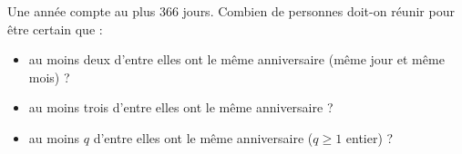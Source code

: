 Une année compte au plus $366$ jours. Combien de personnes doit-on réunir pour être certain que :
\begin{itemize}
  \item au moins deux d'entre elles ont le même anniversaire (même jour et même mois) ?
  \item au moins trois d'entre elles ont le même anniversaire ?
  \item au moins $q$ d'entre elles ont le même anniversaire ($q \geq 1$ entier) ?
\end{itemize}

